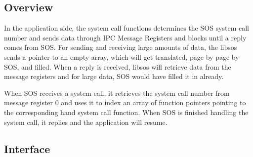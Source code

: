 \documentclass[12pt]{article}
\begin{document}
\subsection{Overview}
In the application side, the system call functions determines the SOS system call number and sends data through IPC Message Registers and blocks until a reply comes from SOS. For sending and receiving large amounts of data, the libsos sends a pointer to an empty array, which will get translated, page by page by SOS, and filled. When a reply is received, libsos will retrieve data from the message registers and for large data, SOS would have filled it in already.

When SOS receives a system call, it retrieves the system call number from message register 0 and uses it to index an array of function pointers pointing to the corresponding hand system call function. When SOS is finished handling the system call, it replies and the application will resume.
\subsection{Interface}
\end{document}
